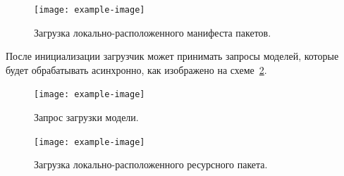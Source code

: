 \begin{figure}[!htp]
    \centering
    \texttt{[image: example-image]}
    \caption{Загрузка локально-расположенного манифеста пакетов.}
    \label{figure:SLocalLoadManifestBundle}
\end{figure}

После инициализации загрузчик может принимать запросы моделей,
которые будет обрабатывать асинхронно, как изображено
на схеме~\ref{figure:SModelRequest}.

\begin{figure}[!htp]
    \centering
    \texttt{[image: example-image]}
    \caption{Запрос загрузки модели.}
    \label{figure:SModelRequest}
\end{figure}


\begin{figure}[!htp]
    \centering
    \texttt{[image: example-image]}
    \caption{Загрузка локально-расположенного ресурсного пакета.}
    \label{figure:SLocalLoadBundle}
\end{figure}
